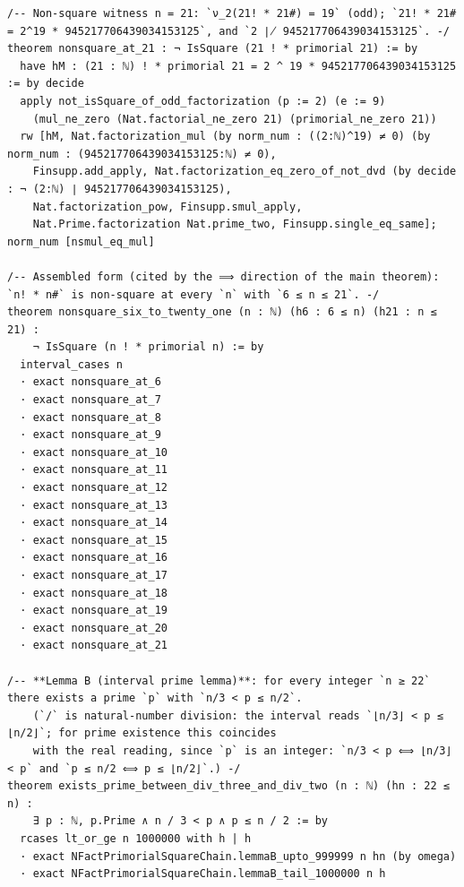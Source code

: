 \documentclass[11pt]{article}
\theoremstyle{definition}
\begin{document}
\begin{lstlisting}
/-- Non-square witness n = 21: `ν_2(21! * 21#) = 19` (odd); `21! * 21# = 2^19 * 945217706439034153125`, and `2 ∤ 945217706439034153125`. -/
theorem nonsquare_at_21 : ¬ IsSquare (21 ! * primorial 21) := by
  have hM : (21 : ℕ) ! * primorial 21 = 2 ^ 19 * 945217706439034153125 := by decide
  apply not_isSquare_of_odd_factorization (p := 2) (e := 9)
    (mul_ne_zero (Nat.factorial_ne_zero 21) (primorial_ne_zero 21))
  rw [hM, Nat.factorization_mul (by norm_num : ((2:ℕ)^19) ≠ 0) (by norm_num : (945217706439034153125:ℕ) ≠ 0),
    Finsupp.add_apply, Nat.factorization_eq_zero_of_not_dvd (by decide : ¬ (2:ℕ) ∣ 945217706439034153125),
    Nat.factorization_pow, Finsupp.smul_apply,
    Nat.Prime.factorization Nat.prime_two, Finsupp.single_eq_same]; norm_num [nsmul_eq_mul]

/-- Assembled form (cited by the ⟹ direction of the main theorem): `n! * n#` is non-square at every `n` with `6 ≤ n ≤ 21`. -/
theorem nonsquare_six_to_twenty_one (n : ℕ) (h6 : 6 ≤ n) (h21 : n ≤ 21) :
    ¬ IsSquare (n ! * primorial n) := by
  interval_cases n
  · exact nonsquare_at_6
  · exact nonsquare_at_7
  · exact nonsquare_at_8
  · exact nonsquare_at_9
  · exact nonsquare_at_10
  · exact nonsquare_at_11
  · exact nonsquare_at_12
  · exact nonsquare_at_13
  · exact nonsquare_at_14
  · exact nonsquare_at_15
  · exact nonsquare_at_16
  · exact nonsquare_at_17
  · exact nonsquare_at_18
  · exact nonsquare_at_19
  · exact nonsquare_at_20
  · exact nonsquare_at_21

/-- **Lemma B (interval prime lemma)**: for every integer `n ≥ 22` there exists a prime `p` with `n/3 < p ≤ n/2`.
    (`/` is natural-number division: the interval reads `⌊n/3⌋ < p ≤ ⌊n/2⌋`; for prime existence this coincides
    with the real reading, since `p` is an integer: `n/3 < p ⟺ ⌊n/3⌋ < p` and `p ≤ n/2 ⟺ p ≤ ⌊n/2⌋`.) -/
theorem exists_prime_between_div_three_and_div_two (n : ℕ) (hn : 22 ≤ n) :
    ∃ p : ℕ, p.Prime ∧ n / 3 < p ∧ p ≤ n / 2 := by
  rcases lt_or_ge n 1000000 with h | h
  · exact NFactPrimorialSquareChain.lemmaB_upto_999999 n hn (by omega)
  · exact NFactPrimorialSquareChain.lemmaB_tail_1000000 n h


\end{lstlisting}
\end{document}
